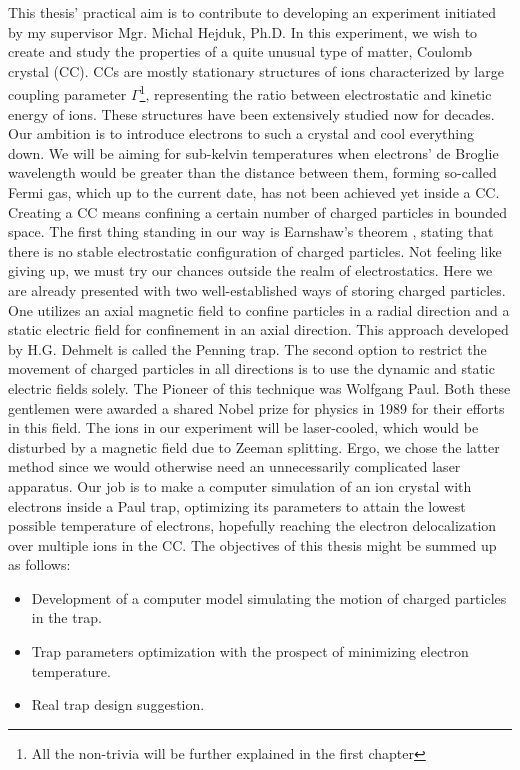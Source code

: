 
This thesis' practical aim is to contribute to developing an experiment initiated by my supervisor Mgr. Michal Hejduk, Ph.D. In this experiment, we wish to create and study the properties of a quite unusual type of matter, Coulomb crystal (CC). CCs are mostly stationary structures of ions characterized by large coupling parameter $\Gamma$\footnote{All the non-trivia will be further explained in the first chapter}, representing the ratio between electrostatic and kinetic energy of ions. These structures have been extensively studied now for decades. Our ambition is to introduce electrons to such a crystal and cool everything down. We will be aiming for sub-kelvin temperatures when electrons' de Broglie wavelength would be greater than the distance between them, forming so-called Fermi gas, which up to the current date, has not been achieved yet inside a CC. Creating a CC means confining a certain number of charged particles in bounded space. The first thing standing in our way is Earnshaw's theorem \cite{earnshaw1848nature}, stating that there is no stable electrostatic configuration of charged particles. Not feeling like giving up, we must try our chances outside the realm of electrostatics. Here we are already presented with two well-established ways of storing charged particles. One utilizes an axial magnetic field to confine particles in a radial direction and a static electric field for confinement in an axial direction. This approach developed by H.G. Dehmelt is called the Penning trap. The second option to restrict the movement of charged particles in all directions is to use the dynamic and static electric fields solely. The Pioneer of this technique was Wolfgang Paul. Both these gentlemen were awarded a shared Nobel prize for physics in 1989 for their efforts in this field. The ions in our experiment will be laser-cooled, which would be disturbed by a magnetic field due to Zeeman splitting. Ergo, we chose the latter method since we would otherwise need an unnecessarily complicated laser apparatus. Our job is to make a computer simulation of an ion crystal with electrons inside a Paul trap, optimizing its parameters to attain the lowest possible temperature of electrons, hopefully reaching the electron delocalization over multiple ions in the CC. The objectives of this thesis might be summed up as follows:
\begin{itemize}
	\item Development of a computer model simulating the motion of charged particles in the trap.
	\item Trap parameters optimization with the prospect of minimizing electron temperature.
	\item Real trap design suggestion.
\end{itemize}